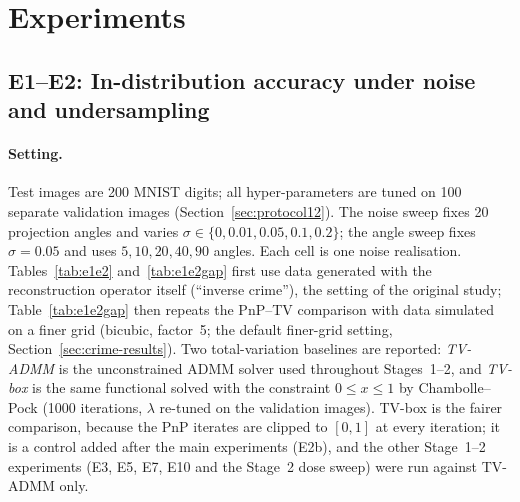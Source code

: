 \section{Experiments}
\label{sec:experiments}
\subsection{E1--E2: In-distribution accuracy under noise and undersampling}\label{sec:e1e2}
\paragraph{Setting.}
Test images are 200 MNIST digits; all hyper-parameters are tuned on 100 separate validation images (Section~\ref{sec:protocol12}). The
noise sweep fixes 20 projection angles and varies $\sigma\in\{0,0.01,0.05,0.1,0.2\}$; the angle sweep fixes
$\sigma=0.05$ and uses $5,10,20,40,90$ angles. Each cell is one noise realisation. Tables~\ref{tab:e1e2} and~\ref{tab:e1e2gap} first use data generated with the reconstruction
operator itself (``inverse crime''), the setting of the original study; Table~\ref{tab:e1e2gap} then repeats the PnP--TV
comparison with data simulated on a finer grid (bicubic, factor~5; the default finer-grid setting, Section~\ref{sec:crime-results}).
Two total-variation baselines are reported: \emph{TV-ADMM} is the unconstrained ADMM solver used throughout Stages~1--2, and
\emph{TV-box} is the same functional solved with the constraint $0\le x\le1$ by Chambolle--Pock (1000 iterations, $\lambda$ re-tuned on the validation images).
TV-box is the fairer comparison, because the PnP iterates are clipped to $[0,1]$ at every iteration; it is a control added after the main experiments (E2b), and the other
Stage~1--2 experiments (E3, E5, E7, E10 and the Stage~2 dose sweep) were run against TV-ADMM only.

